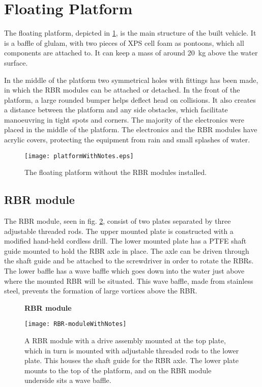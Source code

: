\section{Floating Platform}
The floating platform, depicted in
\cref{fig:floatingPlatform}, is the main structure of the built vehicle.
It is a baffle of glulam, with two pieces of XPS cell foam as
pontoons, which all components are attached to. It can keep a mass of
around 20~kg above the water surface.%

In the middle of the platform two symmetrical holes with fittings has
been made, in which the RBR modules can be attached or detached. In the front of the platform, a large rounded bumper helps deflect head on collisions. It also creates a distance between the platform and
any side obstacles, which facilitate manoeuvring in tight spots and corners. The majority of the electronics were placed in the middle of the platform. The electronics and the RBR modules have acrylic
covers, protecting the equipment from rain and small splashes of water.

\begin{figure}[h]
   \centering
   \texttt{[image: platformWithNotes.eps]}
   \caption{The floating platform without the RBR modules installed.}
   \label{fig:floatingPlatform}
\end{figure}

\subsection{RBR module}
The RBR module, seen in fig. \ref{fig:rbr-module}, consist of two plates separated by three adjustable threaded
rods. The upper mounted plate is constructed with a modified hand-held cordless drill. The lower mounted
plate has a PTFE shaft guide mounted to hold the RBR axle in place. The axle can be driven through the shaft guide and be attached to the screwdriver in order to rotate the RBRs. The lower baffle has a
wave baffle which goes down into the water just above where the mounted RBR
will be situated. This wave baffle, made from stainless steel, prevents the formation of large vortices above the RBR.

\begin{figure}[H]
  \centering
  \textbf{RBR module}
  \par\medskip
  \texttt{[image: RBR-moduleWithNotes]}
  \caption{A RBR module with a drive assembly mounted at the top plate,
    which in turn is mounted with adjustable threaded rods to the lower plate. This houses the shaft guide for the RBR axle. The lower plate mounts to the
    top of the platform, and on the RBR module underside sits a wave baffle.}\label{fig:rbr-module}
\end{figure}

